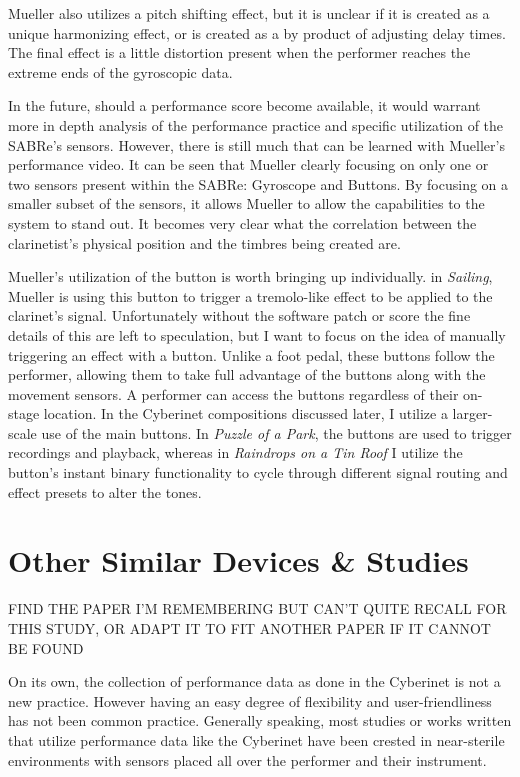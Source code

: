 Mueller also utilizes a pitch shifting effect, but it is unclear if it is created as a unique harmonizing effect, or is created as a by product of adjusting delay times. The final effect is a little distortion present when the performer reaches the extreme ends of the gyroscopic data.

In the future, should a performance score become available, it would warrant more in depth analysis of the performance practice and specific utilization of the SABRe's sensors. However, there is still much that can be learned with Mueller's performance video. It can be seen that Mueller clearly focusing on only one or two sensors present within the SABRe: Gyroscope and Buttons. By focusing on a smaller subset of the sensors, it allows Mueller to allow the capabilities to the system to stand out. It becomes very clear what the correlation between the clarinetist's physical position and the timbres being created are.

Mueller's utilization of the button is worth bringing up individually. in \textit{Sailing}, Mueller is using this button to trigger a tremolo-like effect to be applied to the clarinet's signal. Unfortunately without the software patch or score the fine details of this are left to speculation, but I want to focus on the idea of manually triggering an effect with a button. Unlike a foot pedal, these buttons follow the performer, allowing them to take full advantage of the buttons along with the movement sensors. A performer can access the buttons regardless of their on-stage location. In the Cyberinet compositions discussed later, I utilize a larger-scale use of the main buttons. In \textit{Puzzle of a Park}, the buttons are used to trigger recordings and playback, whereas in \textit{Raindrops on a Tin Roof} I utilize the button's instant binary functionality to cycle through different signal routing and effect presets to alter the tones.

\section{Other Similar Devices \& Studies}

FIND THE PAPER I'M REMEMBERING BUT CAN'T QUITE RECALL FOR THIS STUDY, OR ADAPT IT TO FIT ANOTHER PAPER IF IT CANNOT BE FOUND

On its own, the collection of performance data as done in the Cyberinet is not a new practice. However having an easy degree of flexibility and user-friendliness has not been common practice. Generally speaking, most studies or works written that utilize performance data like the Cyberinet have been crested in near-sterile environments with sensors placed all over the performer and their instrument. 

